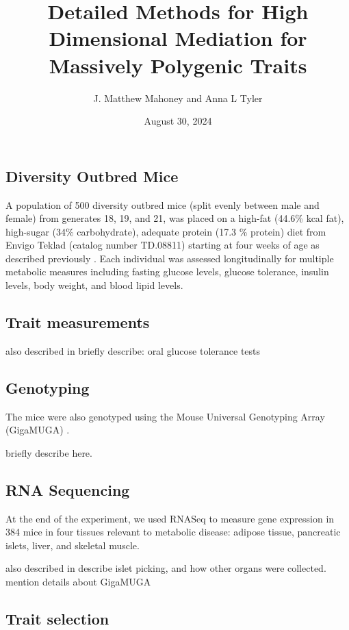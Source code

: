 \documentclass[
]{article}
\title{Detailed Methods for High Dimensional Mediation for Massively
Polygenic Traits}
\author{J. Matthew Mahoney and Anna L Tyler}
\date{August 30, 2024}
\begin{document}
\maketitle

\subsection{Diversity Outbred Mice}\label{diversity-outbred-mice}

A population of 500 diversity outbred mice (split evenly between male
and female) from generates 18, 19, and 21, was placed on a high-fat
(44.6\% kcal fat), high-sugar (34\% carbohydrate), adequate protein
(17.3 \% protein) diet from Envigo Teklad (catalog number TD.08811)
starting at four weeks of age as described previously
\cite{pmid29567659}. Each individual was assessed longitudinally for
multiple metabolic measures including fasting glucose levels, glucose
tolerance, insulin levels, body weight, and blood lipid levels.

\subsection{Trait measurements}\label{trait-measurements}

also described in \cite{pmid29567659} briefly describe: oral glucose
tolerance tests

\subsection{Genotyping}\label{genotyping}

The mice were also genotyped using the Mouse Universal Genotyping Array
(GigaMUGA) \cite{pmid29567659} .

briefly describe here.

\subsection{RNA Sequencing}\label{rna-sequencing}

At the end of the experiment, we used RNASeq to measure gene expression
in 384 mice in four tissues relevant to metabolic disease: adipose
tissue, pancreatic islets, liver, and skeletal muscle.

also described in \cite{pmid29567659} describe islet picking, and how
other organs were collected. mention details about GigaMUGA

\subsection{Trait selection}\label{trait-selection}
\end{document}
